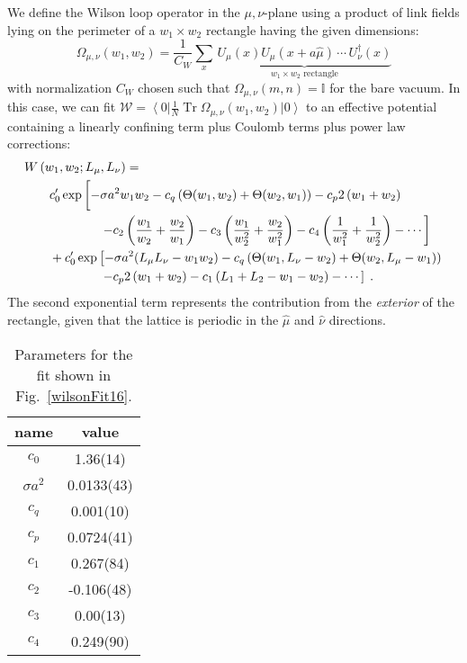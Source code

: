 \documentclass[preprint,aps,prd]{revtex4-2}
\newcommand{\be}{\begin{equation}}
\newcommand{\eq}{\end{equation}}
\newcommand\wilson[4]{\Omega_{#1, #2}\left(#3,#4\right)}
\DeclareMathOperator{\Tr}{Tr}
\begin{document}
We define the Wilson loop operator in the $\mu,\nu$-plane using a product of
link fields lying on the perimeter of a $w_1\times w_2$ rectangle
having the given dimensions:
\be
       \wilson{\mu}{\nu}{w_1}{w_2} = \frac{1}{C_W} \sum_{x}\,
         \underbrace{U_\mu(x) U_\mu(x+a \hat{\mu}) \,\cdots\, U_\nu^\dagger (x)
         }_{\mbox{$w_1\times w_2$ rectangle}}
\eq
with normalization $C_W$ chosen such that $\wilson{\mu}{\nu}{m}{n} = \mathbb{I}$
for the bare vacuum.  In this case, we can fit
$\mathcal{W} = \left\langle 0 \right|
\frac{1}{N} \Tr \wilson{\mu}{\nu}{w_1}{w_2} \left|0\right\rangle $
to an effective
potential containing a linearly confining term plus Coulomb terms
plus power law corrections:
%
\begin{align}
  \MoveEqLeft W\left(w_1, w_2; L_\mu, L_\nu\right) =  \nonumber \\
       & c_0^\prime \exp\left[
       -\sigma a^2 w_1 w_2 
       - c_q  \left(\Theta\!\left(w_1, w_2\right) +
       \Theta\!\left(w_2, w_1\right)\right)
       - c_p  2\left(w_1+w_2\right)
     \vphantom{\frac{w_1}{w_2}}\right. \nonumber \\ & \hspace{4em} \left.
           - c_2 \left(\frac{w_1}{w_2}+\frac{w_2}{w_1}\right)
           - c_3 \left(\frac{w_1}{w_2^2}+\frac{w_2}{w_1^2}\right)
           - c_4 \left(\frac{1}{w_1^2}+\frac{1}{w_2^2}\right) - \cdots
       \right]\nonumber\\ &
      \mbox{} + c_0^\prime \exp\left[
       -\sigma a^2 (L_\mu L_\nu - w_1 w_2) -
           c_q  \left(\Theta\!\left(w_1, L_\nu - w_2\right) +
               \Theta\!\left(w_2, L_\mu - w_1\right)\right)
       \right. \nonumber \\ & \hspace{4em} \left.
       - c_p  2\left(w_1+w_2\right) 
     - c_1\left(L_1 +L_2 - w_1 -w_2\right) - \cdots
     \right]\; .  \label{wfit}
\end{align}
%
The second exponential term represents the contribution from
the {\em exterior} of the rectangle, given that the lattice
is periodic in the $\hat{\mu}$ and $\hat\nu$ directions.

%
\begin{table}
  \caption{Parameters for the fit shown in Fig.~\ref{wilsonFit16}.
    \label{wilsonparameters}}
  \begin{tabular}{c|c}
    name & value \\
    \hline
  $c_0$ &  1.36(14)\\
  $\sigma a^2$ & 0.0133(43) \\
  $c_q$ &  0.001(10)\\
  $c_p$ &  0.0724(41)\\
  $c_1$ &  0.267(84)\\
  $c_2$ &  -0.106(48)\\
  $c_3$ &  0.00(13)\\
  $c_4$ & 0.249(90)\\
  \end{tabular}
\end{table}
\end{document}
